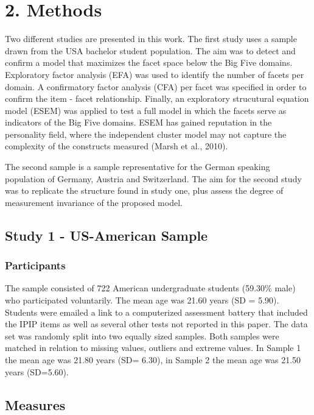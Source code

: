 \documentclass[,man,floatsintext]{apa6}
\theoremstyle{definition}
\theoremstyle{definition}
\theoremstyle{definition}
\theoremstyle{remark}
\begin{document}
\hypertarget{methods}{%
\section{2. Methods}\label{methods}}

Two different studies are presented in this work. The first study uses a
sample drawn from the USA bachelor student population. The aim was to
detect and confirm a model that maximizes the facet space below the Big
Five domains. Exploratory factor analysis (EFA) was used to identify the
number of facets per domain. A confirmatory factor analysis (CFA) per
facet was specified in order to confirm the item - facet relationship.
Finally, an exploratory strucutural equation model (ESEM) was applied to
test a full model in which the facets serve as indicators of the Big
Five domains. ESEM has gained reputation in the personality field, where
the independent cluster model may not capture the complexity of the
constructs measured (Marsh et al., 2010).

The second sample is a sample representative for the German speaking
population of Germany, Austria and Switzerland. The aim for the second
study was to replicate the structure found in study one, plus assess the
degree of measurement invariance of the proposed model.

\hypertarget{study-1---us-american-sample}{%
\subsection{Study 1 - US-American
Sample}\label{study-1---us-american-sample}}

\hypertarget{participants}{%
\subsubsection{Participants}\label{participants}}

The sample consisted of 722 American undergraduate students (59.30\%
male) who participated voluntarily. The mean age was 21.60 years (SD =
5.90). Students were emailed a link to a computerized assessment battery
that included the IPIP items as well as several other tests not reported
in this paper. The data set was randomly split into two equally sized
samples. Both samples were matched in relation to missing values,
outliers and extreme values. In Sample 1 the mean age was 21.80 years
(SD= 6.30), in Sample 2 the mean age was 21.50 years (SD=5.60).

\hypertarget{measures}{%
\subsection{Measures}\label{measures}}
\end{document}

